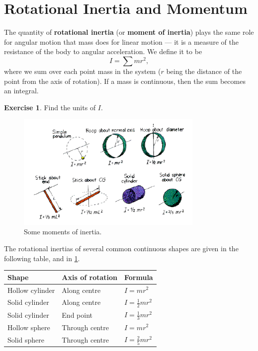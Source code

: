 \documentclass[a4paper]{amsbook}
\theoremstyle{definition}
\newtheorem{exercise}{Exercise}
\numberwithin{exercise}{chapter}
\numberwithin{exercise}{chapter}
\begin{document}
\section{Rotational Inertia and Momentum}
The quantity of \textbf{rotational inertia} (or \textbf{moment of inertia}) plays the same role for angular motion that mass does for
linear motion --- it is a measure of the resistance of the body to angular acceleration. We define it to be
\begin{equation}
  I = \sum mr^2,
\end{equation}
where we sum over each point mass in the system ($ r $ being the distance of the point from the axis of rotation). If
a mass is continuous, then the sum becomes an integral.

\begin{exercise}
  Find the units of $ I $.
\end{exercise}

\begin{figure}
  \centering
  \includegraphics[width=0.8\textwidth]{inertiamoments}
  \caption{Some moments of inertia.\label{fig:inertias}}
\end{figure}

The rotational inertias of several common continuous shapes are given in the following table, and in \cref{fig:inertias}.
\begin{center}
  \def\arraystretch{1.5}
  \begin{tabular}{lll}\hline
    \textbf{Shape} & \textbf{Axis of rotation} & \textbf{Formula}\\\hline
    Hollow cylinder & Along centre & $ I = mr^2 $\\\hline
    Solid cylinder & Along centre & $ I = \frac{1}{2} mr^2 $\\\hline
    Solid cylinder & End point & $ I = \frac{1}{3} mr^2 $\\\hline
    Hollow sphere & Through centre & $ I = mr^2 $\\\hline
    Solid sphere & Through centre & $ I = \frac{2}{5} mr^2 $\\\hline
  \end{tabular}
\end{center}
\end{document}
